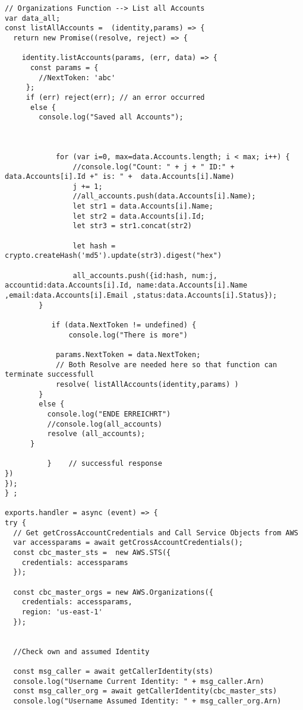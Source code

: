 \begin{lstlisting}[caption={Lambda-Code in NodeJS},
label=lst:Beispielcode 1,basicstyle=\ttfamily\small ]
// Organizations Function --> List all Accounts
var data_all;
const listAllAccounts =  (identity,params) => {
  return new Promise((resolve, reject) => {

    identity.listAccounts(params, (err, data) => {
      const params = {
        //NextToken: 'abc'
     };
     if (err) reject(err); // an error occurred
      else {
        console.log("Saved all Accounts");



            for (var i=0, max=data.Accounts.length; i < max; i++) {
                //console.log("Count: " + j + " ID:" + data.Accounts[i].Id +" is: " +  data.Accounts[i].Name)
                j += 1;
                //all_accounts.push(data.Accounts[i].Name);
                let str1 = data.Accounts[i].Name;
                let str2 = data.Accounts[i].Id;
                let str3 = str1.concat(str2)

                let hash = crypto.createHash('md5').update(str3).digest("hex")

                all_accounts.push({id:hash, num:j, accountid:data.Accounts[i].Id, name:data.Accounts[i].Name ,email:data.Accounts[i].Email ,status:data.Accounts[i].Status});
        }

           if (data.NextToken != undefined) {
               console.log("There is more")

            params.NextToken = data.NextToken;
            // Both Resolve are needed here so that function can terminate successfull
            resolve( listAllAccounts(identity,params) )
        }
        else {
          console.log("ENDE ERREICHRT")
          //console.log(all_accounts)
          resolve (all_accounts);
      }

          }    // successful response
})
});
} ;

exports.handler = async (event) => {
try {
  // Get getCrossAccountCredentials and Call Service Objects from AWS
  var accessparams = await getCrossAccountCredentials();
  const cbc_master_sts =  new AWS.STS({
    credentials: accessparams
  });

  const cbc_master_orgs = new AWS.Organizations({
    credentials: accessparams,
    region: 'us-east-1'
  });


  //Check own and assumed Identity

  const msg_caller = await getCallerIdentity(sts)
  console.log("Username Current Identity: " + msg_caller.Arn)
  const msg_caller_org = await getCallerIdentity(cbc_master_sts)
  console.log("Username Assumed Identity: " + msg_caller_org.Arn)



\end{lstlisting}
